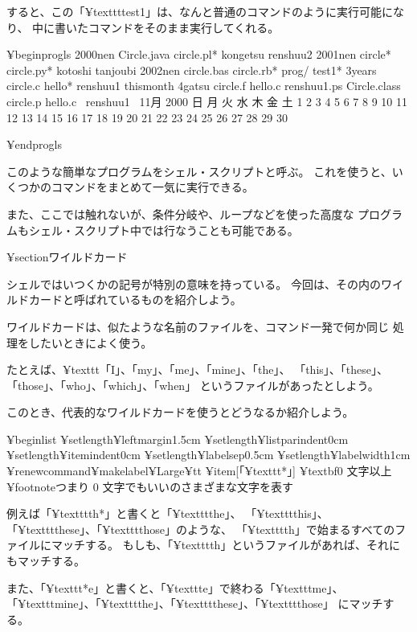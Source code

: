 すると、この「¥texttt{test1}」は、なんと普通のコマンドのように実行可能になり、
中に書いたコマンドをそのまま実行してくれる。

¥begin{progls}
2000nen         Circle.java     circle.pl*      kongetsu        renshuu2
2001nen         circle*         circle.py*      kotoshi         tanjoubi
2002nen         circle.bas      circle.rb*      prog/           test1*
3years          circle.c        hello*          renshuu1        thismonth
4gatsu          circle.f        hello.c         renshuu1.ps
Circle.class    circle.p        hello.c~        renshuu1~
     11月 2000
日 月 火 水 木 金 土
          1  2  3  4
 5  6  7  8  9 10 11
12 13 14 15 16 17 18
19 20 21 22 23 24 25
26 27 28 29 30

%
¥end{progls}

このような簡単なプログラムをシェル・スクリプトと呼ぶ。
これを使うと、いくつかのコマンドをまとめて一気に実行できる。

また、ここでは触れないが、条件分岐や、ループなどを使った高度な
プログラムもシェル・スクリプト中では行なうことも可能である。

¥section{ワイルドカード}

シェルではいつくかの記号が特別の意味を持っている。
今回は、その内のワイルドカードと呼ばれているものを紹介しよう。

ワイルドカードは、似たような名前のファイルを、コマンド一発で何か同じ
処理をしたいときによく使う。

たとえば、¥texttt{「I」、「my」、「me」、「mine」、「the」、
「this」、「these」、「those」、「who」、「which」、「when」}
というファイルがあったとしよう。

このとき、代表的なワイルドカードを使うとどうなるか紹介しよう。

¥begin{list}{}{
¥setlength{¥leftmargin}{1.5cm}
¥setlength{¥listparindent}{0cm}
¥setlength{¥itemindent}{0cm}
¥setlength{¥labelsep}{0.5cm}
¥setlength{¥labelwidth}{1cm}
}
¥renewcommand{¥makelabel}{¥Large¥tt}
¥item[「¥texttt{*}」] ¥textbf{0 文字以上¥footnote{つまり 0 文字でもいい}のさまざまな文字を表す}

例えば「¥texttt{th*}」と書くと「¥texttt{the}」、
「¥texttt{this}」、「¥texttt{these}」、「¥texttt{those}」のような、
「¥texttt{th}」で始まるすべてのファイルにマッチする。
もしも、「¥texttt{th}」というファイルがあれば、それにもマッチする。

また、「¥texttt{*e}」と書くと、「¥texttt{e}」で終わる「¥texttt{me}」、
「¥texttt{mine}」、「¥texttt{the}」、「¥texttt{these}」、「¥texttt{those}」
にマッチする。

